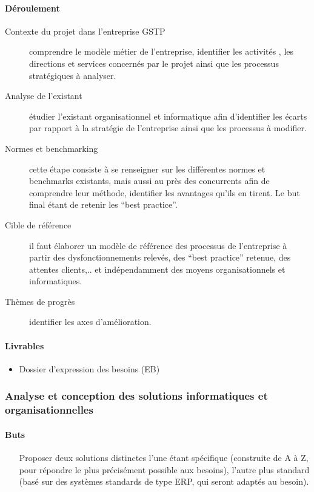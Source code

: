 \paragraph{Déroulement}
\begin{description}
    \item[Contexte du projet dans l’entreprise GSTP]{
        comprendre le modèle métier de l'entreprise, identifier les activités , les directions et services concernés par le projet ainsi que les processus stratégiques à analyser.
    }
    \item[Analyse de l’existant]{
        étudier l’existant organisationnel et informatique afin d’identifier les écarts par rapport à la stratégie de l’entreprise ainsi que les processus à modifier. 
    }

    \item[Normes et benchmarking]{
        cette étape consiste à se renseigner sur les différentes normes et benchmarks existants, mais aussi au près des concurrents afin de comprendre leur méthode, identifier les avantages qu’ils en tirent.  Le but final étant de retenir les “best practice”.
    }

    \item[Cible de référence]{
        il faut élaborer un modèle de référence des processus de l’entreprise à partir des dysfonctionnements relevés, des “best practice” retenue, des attentes clients,..  et indépendamment  des moyens organisationnels et informatiques.
    }

    \item[Thèmes de progrès]{
        identifier les axes d’amélioration.
    }
\end{description}

\paragraph{Livrables}
\begin{itemize}
    \item Dossier d’expression des besoins (EB)
\end{itemize}

\subsubsection{Analyse et conception des solutions informatiques et organisationnelles}

\paragraph{Buts}
\begin{itemize}
    \item[Proposer deux solutions distinctes]{
        l’une étant spécifique (construite de A à Z, pour répondre le plus précisément possible aux besoins), l’autre plus standard (basé sur des systèmes standards de type ERP, qui seront adaptés au besoin).
    }
\end{itemize}



